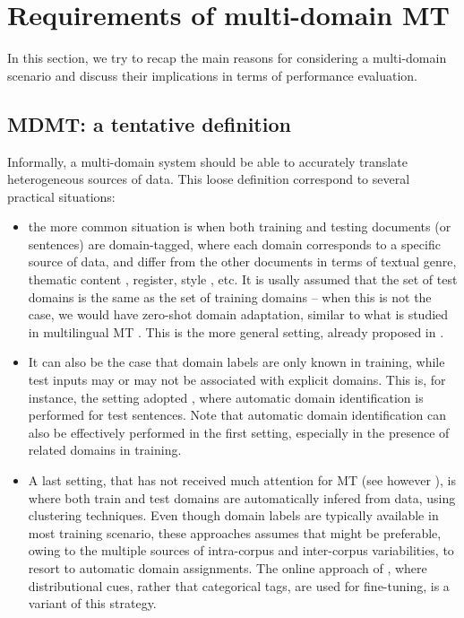 \documentclass[11pt]{article}
\newcommand{\fyTodo}[1]{\Todo[FY:]{\textcolor{orange}{#1}}}
\begin{document}
\section{Requirements of multi-domain MT \label{sec:requirements}}
In this section, we try to recap the main reasons for considering a multi-domain scenario and discuss their implications in terms of performance evaluation.

\subsection{MDMT: a tentative definition}
Informally, a multi-domain system should be able to accurately translate heterogeneous sources of data. This loose definition correspond to several practical situations:
\begin{itemize}
\item the more common situation is when both training and testing documents (or sentences) are domain-tagged, where each domain corresponds to a specific source of data, and differ from the other documents in terms of textual genre, thematic content \cite{Zhang16topicinformed}, register, style \cite{Niu18multitask}, etc. It is usally assumed that the set of test domains is the same as the set of training domains -- when this is not the case, we would have zero-shot domain adaptation, similar to what is studied in multilingual MT \cite{Firat16multiway,Ha16towards,Johnson17google,Platanios18contextual}. This is the more general setting, already proposed in \cite{Dredze09multidomain}.\fyTodo{do we need a name: such as supervised MDMT ? and mostly supervised MDMT for the second case ?}

\item It can also be the case that domain labels are only known in training, while test inputs may or may not be associated with explicit domains. This is, for instance, the setting adopted \cite{Zeng18multidomain}, where automatic domain identification is performed for test sentences. Note that automatic domain identification can also be effectively performed in the first setting, especially in the presence of related domains in training.
  
\item A last setting, that has not received much attention for MT (see however \cite{Sennrich13multidomain}), is where both train and test domains are automatically infered from data, using clustering techniques. Even though domain labels are typically available in most training scenario, these approaches assumes that might be preferable, owing to the multiple sources of intra-corpus and inter-corpus variabilities, to resort to automatic domain assignments. The online approach of , where distributional cues, rather that categorical tags, are used for fine-tuning, is a variant of this strategy.
\end{itemize}
\end{document}
